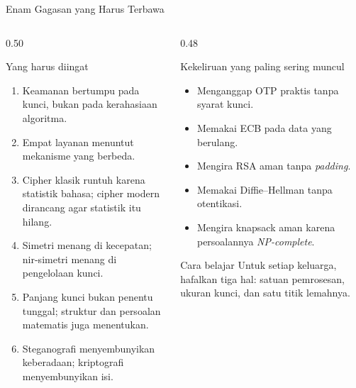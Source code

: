\documentclass[aspectratio=169,11pt]{beamer}
\begin{document}
\begin{frame}{Enam Gagasan yang Harus Terbawa}
    \footnotesize
    \begin{columns}[T,onlytextwidth]
        \begin{column}{0.50\textwidth}
            \begin{block}{Yang harus diingat}
                \begin{enumerate}
                    \setlength{\itemsep}{1pt}
                    \item Keamanan bertumpu pada kunci, bukan pada kerahasiaan
                          algoritma.
                    \item Empat layanan menuntut mekanisme yang berbeda.
                    \item Cipher klasik runtuh karena statistik bahasa; cipher
                          modern dirancang agar statistik itu hilang.
                    \item Simetri menang di kecepatan; nir-simetri menang di
                          pengelolaan kunci.
                    \item Panjang kunci bukan penentu tunggal; struktur dan
                          persoalan matematis juga menentukan.
                    \item Steganografi menyembunyikan keberadaan; kriptografi
                          menyembunyikan isi.
                \end{enumerate}
            \end{block}
        \end{column}
        \begin{column}{0.48\textwidth}
            \begin{alertblock}{Kekeliruan yang paling sering muncul}
                \begin{itemize}
                    \setlength{\itemsep}{2pt}
                    \item Menganggap OTP praktis tanpa syarat kunci.
                    \item Memakai ECB pada data yang berulang.
                    \item Mengira RSA aman tanpa \textit{padding}.
                    \item Memakai Diffie--Hellman tanpa otentikasi.
                    \item Mengira knapsack aman karena persoalannya
                          \textit{NP-complete}.
                \end{itemize}
            \end{alertblock}
            \begin{exampleblock}{Cara belajar}
                \footnotesize
                Untuk setiap keluarga, hafalkan tiga hal: satuan pemrosesan,
                ukuran kunci, dan satu titik lemahnya.
            \end{exampleblock}
        \end{column}
    \end{columns}
\end{frame}
\end{document}
